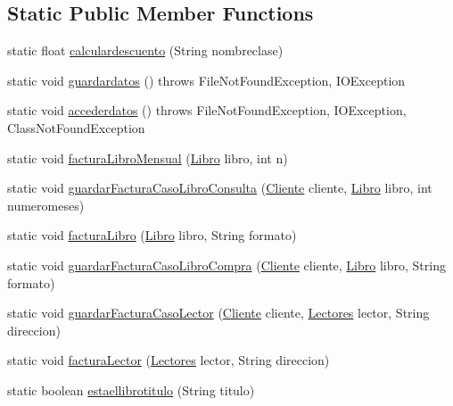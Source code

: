 \subsection*{Static Public Member Functions}
\begin{DoxyCompactItemize}
\item 
static float \mbox{\hyperlink{classlibreria_1_1_libreria_a33f2cc093f3c15f09e146283e0c025d7}{calculardescuento}} (String nombreclase)
\item 
static void \mbox{\hyperlink{classlibreria_1_1_libreria_abc10249e70e74a9ba55a081bbf23cfcd}{guardardatos}} ()  throws File\+Not\+Found\+Exception, I\+O\+Exception
\item 
static void \mbox{\hyperlink{classlibreria_1_1_libreria_a0ebf81d2e66a26a82de5b997aae37065}{accederdatos}} ()  throws File\+Not\+Found\+Exception, I\+O\+Exception, Class\+Not\+Found\+Exception
\item 
static void \mbox{\hyperlink{classlibreria_1_1_libreria_ad54897f12a3077bb2f29f51663049d20}{factura\+Libro\+Mensual}} (\mbox{\hyperlink{classlibreria_1_1_libro}{Libro}} libro, int n)
\item 
static void \mbox{\hyperlink{classlibreria_1_1_libreria_a6d56a0ad8d97bfa5625e6712eeba1ec3}{guardar\+Factura\+Caso\+Libro\+Consulta}} (\mbox{\hyperlink{classlibreria_1_1_cliente}{Cliente}} cliente, \mbox{\hyperlink{classlibreria_1_1_libro}{Libro}} libro, int numeromeses)
\item 
static void \mbox{\hyperlink{classlibreria_1_1_libreria_ac64f9e699ce3d10290c3f3303611b04a}{factura\+Libro}} (\mbox{\hyperlink{classlibreria_1_1_libro}{Libro}} libro, String formato)
\item 
static void \mbox{\hyperlink{classlibreria_1_1_libreria_a45eb93a6c3196e51a3b37075001ba215}{guardar\+Factura\+Caso\+Libro\+Compra}} (\mbox{\hyperlink{classlibreria_1_1_cliente}{Cliente}} cliente, \mbox{\hyperlink{classlibreria_1_1_libro}{Libro}} libro, String formato)
\item 
static void \mbox{\hyperlink{classlibreria_1_1_libreria_a6a77f1405b57c77f702d8438aec968e8}{guardar\+Factura\+Caso\+Lector}} (\mbox{\hyperlink{classlibreria_1_1_cliente}{Cliente}} cliente, \mbox{\hyperlink{classlibreria_1_1_lectores}{Lectores}} lector, String direccion)
\item 
static void \mbox{\hyperlink{classlibreria_1_1_libreria_a706ac513e37d19235273ec939e4fa8ac}{factura\+Lector}} (\mbox{\hyperlink{classlibreria_1_1_lectores}{Lectores}} lector, String direccion)
\item 
static boolean \mbox{\hyperlink{classlibreria_1_1_libreria_aec6380fd1bcff89fb0f2d6d4b4584598}{estaellibrotitulo}} (String titulo)

\end{DoxyCompactItemize}
